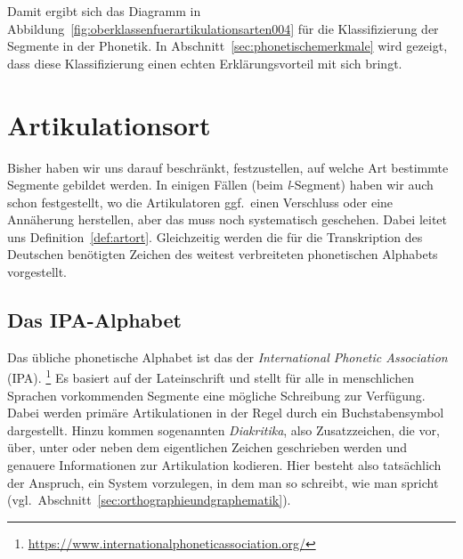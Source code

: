 
Damit ergibt sich das Diagramm in Abbildung~\ref{fig:oberklassenfuerartikulationsarten004} für die Klassifizierung der Segmente in der Phonetik.
In Abschnitt~\ref{sec:phonetischemerkmale} wird gezeigt, dass diese Klassifizierung einen echten Erklärungsvorteil mit sich bringt.

\Enl[2]


\Np

\section{Artikulationsort}
\label{sec:artikulationsort}

Bisher haben wir uns darauf beschränkt, festzustellen, auf welche Art bestimmte Segmente gebildet werden.
In einigen Fällen (\zB beim \textit{l}-Segment) haben wir auch schon festgestellt, wo die Artikulatoren ggf.\ einen Verschluss oder eine Annäherung herstellen, aber das muss noch systematisch geschehen.
Dabei leitet uns Definition~\ref{def:artort}.
Gleichzeitig werden die für die Transkription des Deutschen benötigten Zeichen des weitest verbreiteten phonetischen Alphabets vorgestellt.


\subsection{Das IPA-Alphabet}
\label{sec:dasipaalphabet}

Das übliche phonetische Alphabet ist das der \textit{International Phonetic Association} (IPA).%
\footnote{\url{https://www.internationalphoneticassociation.org/}}
Es basiert auf der Lateinschrift und stellt für alle in menschlichen Sprachen vorkommenden Segmente eine mögliche Schreibung zur Verfügung.
Dabei werden primäre Artikulationen in der Regel durch ein Buchstabensymbol dargestellt.
Hinzu kommen sogenannten \textit{Diakritika}, also Zusatzzeichen, die vor, über, unter oder neben dem eigentlichen Zeichen geschrieben werden und genauere Informationen zur Artikulation kodieren.
Hier besteht also tatsächlich der Anspruch, ein System vorzulegen, in dem man so schreibt, wie man spricht (vgl.\ Abschnitt~\ref{sec:orthographieundgraphematik}).

